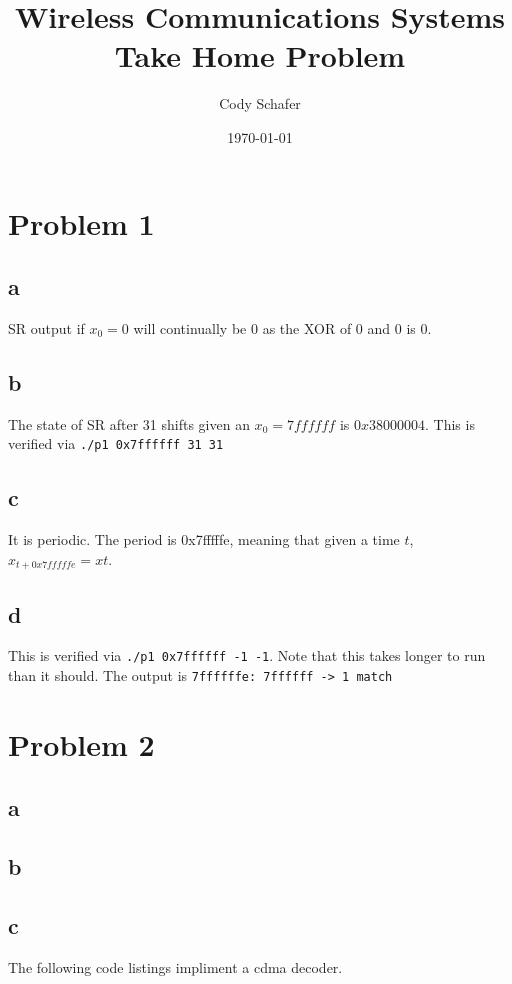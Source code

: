 \documentclass{article}
\title{Wireless Communications Systems \\
	Take Home Problem}
\author{Cody Schafer}
\date{\today}
\begin{document}
	\titlepage

\section{Problem 1}

\subsection{a}
SR output if $x_0 = 0$ will continually be 0 as the XOR of 0 and 0 is 0.

\subsection{b}
The state of SR after 31 shifts given an $x_0 = 7ffffff$ is $0x38000004$. This is verified via \texttt{./p1 0x7ffffff 31 31}

\subsection{c}
It is periodic. The period is 0x7fffffe, meaning that given a time $t$, $x_{t+0x7fffffe} = x{t}$.

\subsection{d}
This is verified via \texttt{./p1 0x7ffffff -1 -1}. Note that this takes longer to run than it should.
The output is \texttt{7ffffffe: 7ffffff -> 1
	match
}



\section{Problem 2}

\subsection{a}

\subsection{b}

\subsection{c}

The following code listings impliment a cdma decoder.



\end{document}
